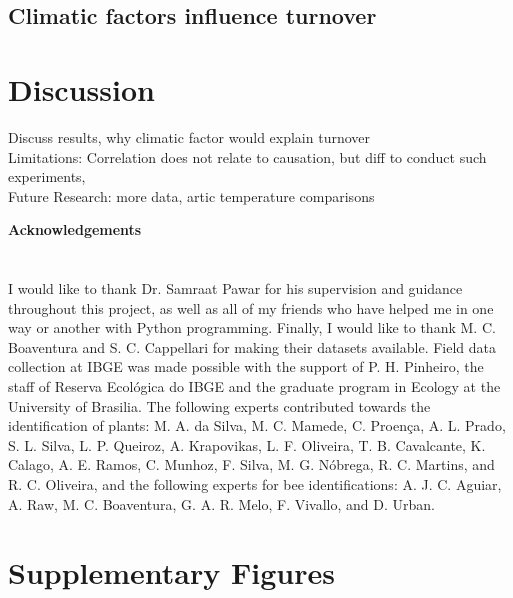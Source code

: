 \documentclass[11pt]{article}
\begin{document}
\subsection{Climatic factors influence turnover}


\newpage
\section{Discussion} %
Discuss results, why climatic factor would explain turnover \\
Limitations: Correlation does not relate to causation, but diff to conduct such experiments,  \\
Future Research: more data, artic temperature comparisons \\

\newpage 
\vspace*{\fill}

{\huge\bfseries Acknowledgements} \label{sec: acknowledgements} \\
\\
\\
\large{I would like to thank Dr. Samraat Pawar for his supervision and guidance throughout this project, as well as  all of my friends who have helped me in one way or another with Python programming. Finally, I would like to thank M. C. Boaventura and S. C. Cappellari for making their datasets available. Field data collection at IBGE was made possible with the support of P. H. Pinheiro, the staff of Reserva Ecol\'{o}gica do IBGE and the graduate program in Ecology at the University of Brasilia. The following experts contributed towards the identification of plants: M. A. da Silva, M. C. Mamede, C. Proen\c{c}a, A. L. Prado, S. L. Silva, L. P. Queiroz, A. Krapovikas, L. F. Oliveira, T. B. Cavalcante, K. Calago, A. E. Ramos, C. Munhoz, F. Silva, M. G. N\'{o}brega, R. C. Martins, and R. C. Oliveira, and the following experts for bee identifications: A. J. C. Aguiar, A. Raw, M. C. Boaventura, G. A. R. Melo, F. Vivallo, and D. Urban.}
\vfill

\newpage



\newpage
\section{Supplementary Figures}
\setcounter{equation}{0}
\setcounter{figure}{0}
\setcounter{table}{0}
\makeatletter
\renewcommand{\theequation}{S\arabic{equation}}
\renewcommand{\thefigure}{S\arabic{figure}}
\renewcommand{\bibnumfmt}[1]{[S#1]}
\renewcommand{\citenumfont}[1]{S#1}
\end{document}
